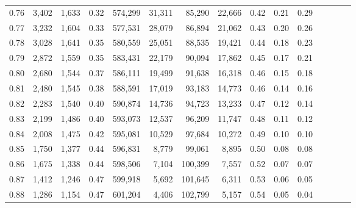 \begin{tabular}{rrrcrrrrrrrrrrr}
0.76 &   3,402 &  1,633 &                                       0.32 &  574,299 &   31,311 &   85,290 &   22,666 &  0.42 &  0.21 &                         0.29 \\
0.77 &   3,232 &  1,604 &                                       0.33 &  577,531 &   28,079 &   86,894 &   21,062 &  0.43 &  0.20 &                         0.26 \\
0.78 &   3,028 &  1,641 &                                       0.35 &  580,559 &   25,051 &   88,535 &   19,421 &  0.44 &  0.18 &                         0.23 \\
0.79 &   2,872 &  1,559 &                                       0.35 &  583,431 &   22,179 &   90,094 &   17,862 &  0.45 &  0.17 &                         0.21 \\
0.80 &   2,680 &  1,544 &                                       0.37 &  586,111 &   19,499 &   91,638 &   16,318 &  0.46 &  0.15 &                         0.18 \\
0.81 &   2,480 &  1,545 &                                       0.38 &  588,591 &   17,019 &   93,183 &   14,773 &  0.46 &  0.14 &                         0.16 \\
0.82 &   2,283 &  1,540 &                                       0.40 &  590,874 &   14,736 &   94,723 &   13,233 &  0.47 &  0.12 &                         0.14 \\
0.83 &   2,199 &  1,486 &                                       0.40 &  593,073 &   12,537 &   96,209 &   11,747 &  0.48 &  0.11 &                         0.12 \\
0.84 &   2,008 &  1,475 &                                       0.42 &  595,081 &   10,529 &   97,684 &   10,272 &  0.49 &  0.10 &                         0.10 \\
0.85 &   1,750 &  1,377 &                                       0.44 &  596,831 &    8,779 &   99,061 &    8,895 &  0.50 &  0.08 &                         0.08 \\
0.86 &   1,675 &  1,338 &                                       0.44 &  598,506 &    7,104 &  100,399 &    7,557 &  0.52 &  0.07 &                         0.07 \\
0.87 &   1,412 &  1,246 &                                       0.47 &  599,918 &    5,692 &  101,645 &    6,311 &  0.53 &  0.06 &                         0.05 \\
0.88 &   1,286 &  1,154 &                                       0.47 &  601,204 &    4,406 &  102,799 &    5,157 &  0.54 &  0.05 &                         0.04 \\

\end{tabular}
